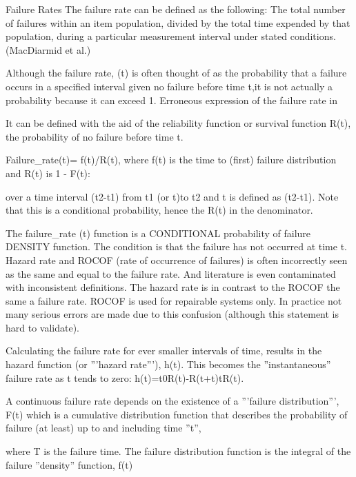 Failure Rates
The failure rate can be defined as the following: The total number of failures within an item population, divided by the total time expended by that population, during a particular measurement interval under stated conditions. (MacDiarmid et al.)
 
Although the failure rate, (t) is often thought of as the probability that a failure occurs in a specified interval given no failure before time t,it is not actually a probability because it can exceed 1. Erroneous expression of the failure rate in %
 
It can be defined with the aid of the reliability function or survival function R(t), the probability of no failure before time t. 
 
Failure_rate(t)= f(t)/R(t), where f(t) is the time to (first) failure distribution and R(t) is 1 - F(t):
 

 
over a time interval (t2-t1) from t1 (or t)to t2 and t is defined as (t2-t1). Note that this is a conditional probability, hence the R(t) in the denominator.
 
The failure_rate (t) function is a CONDITIONAL probability of failure DENSITY function. The condition is that the failure has not occurred at time t. Hazard rate and ROCOF (rate of occurrence of failures) is often incorrectly seen as the same and equal to the failure rate. And literature is even contaminated with inconsistent definitions. The hazard rate is in contrast to the ROCOF  the same a failure rate. ROCOF is used for repairable systems only. In practice not many serious errors are made due to this confusion (although this statement is hard to validate).
 
Calculating the failure rate for ever smaller intervals of time, results in the hazard function (or '''hazard rate'''), h(t). 
This becomes the ''instantaneous'' failure rate as t tends to zero:
h(t)=t0R(t)-R(t+t)tR(t).
 
A continuous failure rate depends on the existence of a '''failure distribution''', F(t) which is a cumulative distribution function that describes the probability of failure (at least) up to and including time ''t'',
 

where T is the failure time.
The failure distribution function is the integral of the failure ''density'' function, f(t)
 
